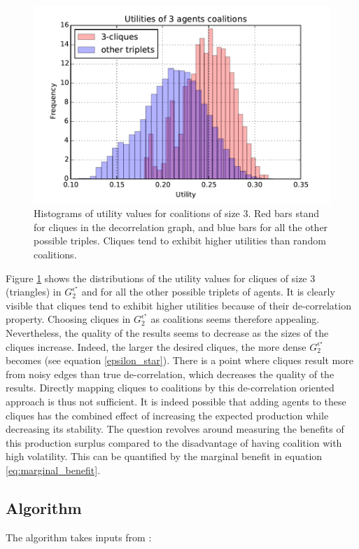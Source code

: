 \documentclass[journal]{IEEEtran}
\begin{document}
\begin{figure}
\includegraphics[scale=.48]{./figs/figure_3}
\caption{{\footnotesize Histograms of utility values for coalitions of size 3. Red bars stand for cliques in the decorrelation graph, and blue bars for all the other possible triples. Cliques tend to exhibit higher utilities than random coalitions.}}
\label{fig:histo_cliques}
\end{figure}

Figure \ref{fig:histo_cliques} shows the distributions of the utility values for cliques of size 3 (triangles) in $ G_{2}^{\epsilon^{\star}} $ and for all the other possible triplets of agents. It is clearly visible that cliques tend to exhibit higher utilities because of their de-correlation property. Choosing cliques in $ G_{2}^{\epsilon^{\star}} $ as coalitions seems therefore appealing. Nevertheless, the quality of the results seems to decrease as the sizes of the cliques increase. Indeed, the larger the desired cliques, the more dense $ G_{2}^{\epsilon^{\star}} $ becomes (see equation \ref{epsilon_star}). There is a point where cliques result more from noisy edges than true de-correlation, which decreases the quality of the results. Directly mapping cliques to coalitions by this de-correlation oriented approach is thus not sufficient. It is indeed possible that adding agents to these cliques has the combined effect of increasing the expected production while decreasing its stability. The question revolves around measuring the benefits of this production surplus compared to the disadvantage of having coalition with high volatility. This can be quantified by the marginal benefit in equation \ref{eq:marginal_benefit}.

\subsection{Algorithm}
The algorithm takes inputs from :
\end{document}
